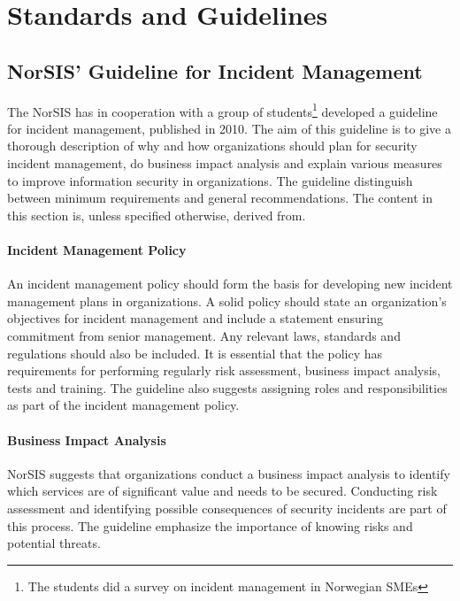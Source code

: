 
\section{Standards and Guidelines}






\subsection{NorSIS' Guideline for Incident Management}
The \ac{NorSIS} has in cooperation with a group of students\footnote{The students did a survey on incident management in Norwegian \acsp{SME}\cite{sand2010hendelseshaandtering}} developed a guideline for incident management, published in 2010\cite{norsisveiledning}. The aim of this guideline is to give a thorough description of why and how organizations should plan for security incident management, do business impact analysis and explain various measures to improve information security in organizations. The guideline distinguish between minimum requirements and general recommendations. The content in this section is, unless specified otherwise, derived from\cite{norsisveiledning}.

\paragraph{Incident Management Policy} 
An incident management policy should form the basis for developing new incident management plans in organizations. A solid policy should state an organization's objectives for incident management and include a statement ensuring commitment from senior management. Any relevant laws, standards and regulations should also be included. It is essential that the policy has requirements for performing regularly risk assessment, business impact analysis, tests and training. The guideline also suggests assigning roles and responsibilities as part of the incident management policy.

\paragraph{Business Impact Analysis}
NorSIS suggests that organizations conduct a business impact analysis to identify which services are of significant value and needs to be secured. Conducting risk assessment and identifying possible consequences of security incidents are part of this process. The guideline emphasize the importance of knowing risks and potential threats.  

